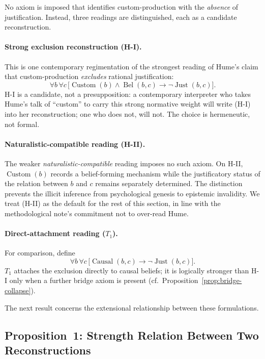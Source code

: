 No axiom is imposed that identifies custom-production with the
\emph{absence} of justification. Instead, three readings are
distinguished, each as a candidate reconstruction.

\paragraph{Strong exclusion reconstruction (H-I).}
This is one contemporary regimentation of the strongest reading of
Hume's claim that custom-production \emph{excludes} rational
justification:
\[
\forall b\,\forall c\,
\bigl[
\operatorname{Custom}(b)\land
\operatorname{Bel}(b,c)
\rightarrow
\neg\operatorname{Just}(b,c)
\bigr].
\tag{H-I}
\]
H-I is a candidate, not a presupposition: a contemporary interpreter
who takes Hume's talk of ``custom'' to carry this strong normative
weight will write (H-I) into her reconstruction; one who does not, will
not. The choice is hermeneutic, not formal.

\paragraph{Naturalistic-compatible reading (H-II).}
The weaker \emph{naturalistic-compatible} reading imposes no such
axiom. On H-II, $\operatorname{Custom}(b)$ records a
belief-forming mechanism while the justificatory status of the
relation between $b$ and $c$ remains separately determined. The
distinction prevents the illicit inference from psychological genesis
to epistemic invalidity. We treat (H-II) as the default for the rest
of this section, in line with the methodological note's commitment
not to over-read Hume.

\paragraph{Direct-attachment reading ($T_1$).}
For comparison, define
\[
\forall b\,\forall c\,
\bigl[
\operatorname{Causal}(b,c)
\rightarrow
\neg\operatorname{Just}(b,c)
\bigr].
\tag{T$_1$}
\]
$T_1$ attaches the exclusion directly to causal beliefs; it is
logically stronger than H-I only when a further bridge axiom is
present (cf.\ Proposition~\ref{prop:bridge-collapse}).

The next result concerns the extensional relationship between
these formulations.

\subsection{Proposition~1: Strength Relation Between Two Reconstructions}
\label{sec:prop1}

